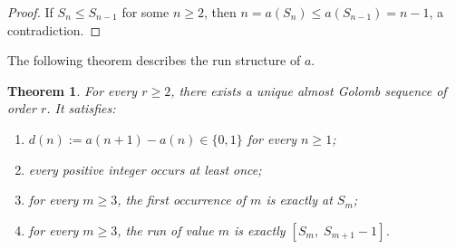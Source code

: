 \documentclass[12pt]{article}
\newtheorem{theorem}{Theorem}[section]
\theoremstyle{definition}
\theoremstyle{remark}
\begin{document}
\begin{proof}
If $S_n\le S_{n-1}$ for some $n\ge 2$, then $n=a(S_n)\le a(S_{n-1})=n-1$,
a contradiction.
\end{proof}

The following theorem describes the run structure of $a$.

\begin{theorem}\label{thm:global_run}
For every $r\ge 2$, there exists a unique almost Golomb sequence of order $r$.
It satisfies:
\begin{enumerate}[label=(\roman*)]
  \item $d(n):=a(n+1)-a(n)\in\{0,1\}$ for every $n\ge 1$;
  \item every positive integer occurs at least once;
  \item for every $m\ge 3$, the first occurrence of $m$ is exactly at $S_m$;
  \item for every $m\ge 3$, the run of value $m$ is exactly $[S_m,\;S_{m+1}-1]$.
\end{enumerate}
\end{theorem}
\end{document}
